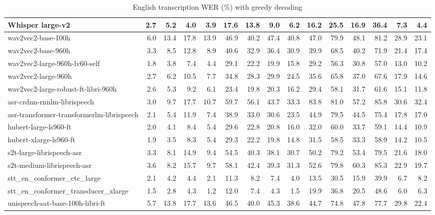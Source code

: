 \documentclass[nohyperref]{article}
\theoremstyle{plain}
\theoremstyle{definition}
\theoremstyle{remark}
\begin{document}
\begin{table}[H]
\begin{tabular}{l|rrrrrrrrrrrrrr}
\\
Whisper large-v2
& 2.7 & 5.2 & 4.0 & 3.9 & 17.6 & 13.8 & 9.0 & 6.2 & 16.2 & 25.5 & 16.9 & 36.4 & 7.3 & 4.4
\\
\midrule
wav2vec2-base-100h 
& 6.0 & 13.4 & 17.8 & 13.9 & 46.9 & 40.2 & 47.4 & 40.8 & 47.0 & 79.9 & 48.1 & 81.2 & 28.9 & 23.1 
\\
wav2vec2-base-960h 
& 3.3 & 8.5 & 12.8 & 8.9 & 40.6 & 32.9 & 36.4 & 30.9 & 39.9 & 68.5 & 40.2 & 71.9 & 21.4 & 17.4 
\\
wav2vec2-large-960h-lv60-self 
& 1.8 & 3.8 & 7.4 & 4.4 & 29.1 & 22.2 & 19.9 & 15.8 & 29.2 & 56.3 & 30.8 & 57.0 & 13.0 & 10.2 
\\
wav2vec2-large-960h 
& 2.7 & 6.2 & 10.5 & 7.7 & 34.8 & 28.3 & 29.9 & 24.5 & 35.6 & 65.8 & 37.0 & 67.6 & 17.9 & 14.6 
\\
wav2vec2-large-robust-ft-libri-960h 
& 2.6 & 5.3 & 9.2 & 6.1 & 23.4 & 19.8 & 20.3 & 16.2 & 29.4 & 58.1 & 31.7 & 61.6 & 15.1 & 11.8 
\\
asr-crdnn-rnnlm-librispeech 
& 3.0 & 9.7 & 17.7 & 10.7 & 59.7 & 56.1 & 43.7 & 33.3 & 83.8 & 81.0 & 57.2 & 85.8 & 30.6 & 32.4 
\\
asr-transformer-transformerlm-librispeech 
& 2.1 & 5.4 & 11.9 & 7.4 & 38.9 & 33.0 & 30.6 & 23.5 & 44.9 & 79.5 & 44.5 & 75.4 & 17.8 & 17.0 
\\
hubert-large-ls960-ft 
& 2.0 & 4.1 & 8.4 & 5.4 & 29.6 & 22.8 & 20.8 & 16.0 & 32.0 & 60.0 & 33.7 & 59.1 & 14.4 & 10.9 
\\
hubert-xlarge-ls960-ft 
& 1.9 & 3.5 & 8.3 & 5.4 & 29.3 & 22.2 & 19.8 & 14.8 & 31.5 & 58.5 & 33.3 & 58.9 & 14.2 & 10.5 
\\
s2t-large-librispeech-asr 
& 3.3 & 8.1 & 14.9 & 9.4 & 54.5 & 40.3 & 38.1 & 30.7 & 50.2 & 79.2 & 53.4 & 79.5 & 21.6 & 18.0 
\\
s2t-medium-librispeech-asr 
& 3.6 & 8.2 & 15.7 & 9.7 & 58.1 & 42.4 & 39.3 & 31.3 & 52.6 & 79.8 & 60.3 & 85.3 & 22.9 & 19.7 
\\
stt\_en\_conformer\_ctc\_large 
& 2.1 & 4.2 & 4.4 & 2.1 & 11.3 & 8.2 & 7.4 & 4.0 & 13.5 & 30.5 & 15.9 & 39.9 & 6.7 & 8.2 
\\
stt\_en\_conformer\_transducer\_xlarge 
& 1.5 & 2.8 & 4.3 & 1.2 & 12.0 & 7.4 & 4.3 & 1.5 & 19.9 & 36.8 & 20.5 & 48.6 & 6.0 & 6.3 
\\
unispeech-sat-base-100h-libri-ft 
& 5.7 & 13.8 & 17.7 & 13.6 & 46.5 & 40.0 & 45.3 & 38.6 & 44.7 & 74.8 & 47.8 & 77.7 & 29.8 & 22.4 
\\
\bottomrule
\end{tabular}
\caption{English transcription WER (\%) with greedy decoding}\label{tab:english-asr-greedy}
\end{table}
 
\end{document}
